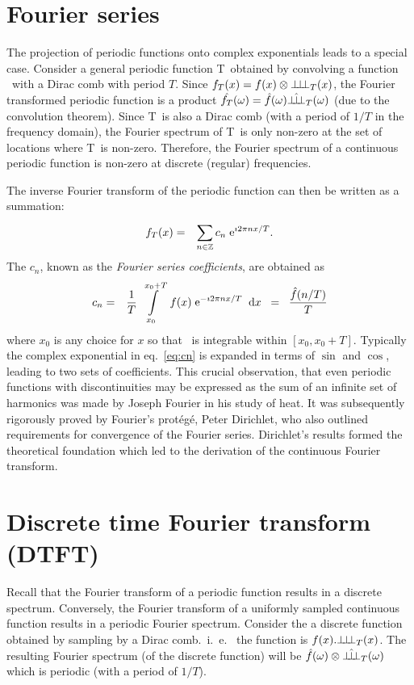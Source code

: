 \section{Fourier series}
The projection of periodic functions onto complex exponentials leads to a special case. Consider a general periodic function \ipn T\ obtained by convolving a function \ifn\ with a Dirac comb  with period $T$. Since $f_{T}(x) = f(x)  \otimes {\bot\hspace{-.7ex}\bot\hspace{-.7ex}\bot}_{T}(x)$, the Fourier transformed periodic function is a product $\hat{f_{T}}(\omega) = \hat{f}(\omega) \hat{{\bot\hspace{-.8ex}\bot\hspace{-.8ex}\bot}}_{T}(\omega)$ (due to the convolution theorem). Since \SHAF T\ is also a Dirac comb (with a period of $1/T$ in the frequency domain), the Fourier spectrum of \ipn T\ is only non-zero at the set of locations where \SHAF T\ is non-zero. Therefore, the Fourier spectrum of a continuous periodic function is non-zero at discrete (regular) frequencies.

The inverse Fourier transform of the periodic function can then be written as a summation:
\begin{eqnarray}
  f_{T}(x) & = & \sum\limits_{n\in\mathbb{Z}}^{} c_n \; \mathrm{e}^{\mathrm{\imath} 2\pi n x / T}.
\end{eqnarray}
The $c_n$, known as the \textit{Fourier series coefficients}, are obtained as 
\begin{eqnarray}
\label{eq:cn}  c_n & = & \frac 1 T \; \displaystyle\int\limits_{x_0}^{x_0+T} \; f(x) \; \mathrm{e}^{- \mathrm{\imath} 2\pi n x / T} \;\; \mathrm{d}x \;\; = \;\; \frac {\hat{f} (n/T)} T
\end{eqnarray}
where $x_0$ is any choice for $x$ so that \ifn\ is integrable within $[x_0, x_0+T]$. Typically the complex exponential in eq.~\ref{eq:cn} is expanded in terms of $\sin{}$ and $\cos{}$, leading to two sets of coefficients. This crucial observation, that even periodic functions with discontinuities may be expressed as the sum of an infinite set of harmonics was made by Joseph Fourier in his study of heat. It was subsequently rigorously proved by Fourier's prot\'eg\'e, Peter Dirichlet, who also outlined requirements for convergence of the Fourier series. Dirichlet's results formed the theoretical foundation which led to the derivation of the continuous Fourier transform. 


\section{Discrete time Fourier transform (DTFT)}
Recall that the Fourier transform of a periodic function results in a discrete spectrum. Conversely, the Fourier transform of a uniformly sampled continuous function results in a periodic Fourier spectrum. Consider the a discrete function obtained by sampling by a Dirac comb.~i.~e.~ the function is $f(x) . {\bot\hspace{-.7ex}\bot\hspace{-.7ex}\bot}_{T}(x)$. The resulting Fourier spectrum (of the discrete function) will be $\hat{f}(\omega) \otimes \hat{{\bot\hspace{-.8ex}\bot\hspace{-.8ex}\bot}}_{T}(\omega)$ which is periodic (with a period of $1/T$).


